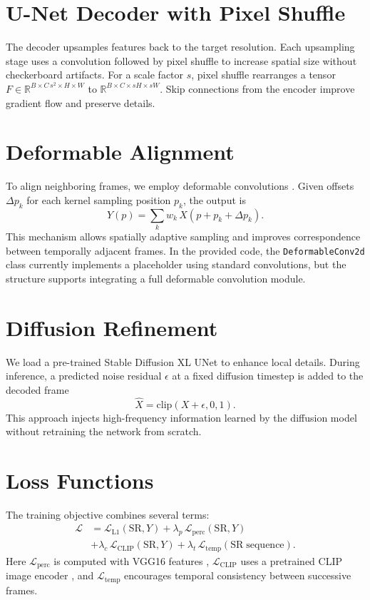 \documentclass{article}
\begin{document}
\section{U-Net Decoder with Pixel Shuffle}
The decoder upsamples features back to the target resolution. Each upsampling stage uses a convolution followed by pixel shuffle to increase spatial size without checkerboard artifacts. For a scale factor $s$, pixel shuffle rearranges a tensor $F \in \mathbb{R}^{B\times C\,s^2\times H\times W}$ to $\mathbb{R}^{B\times C\times sH\times sW}$. Skip connections from the encoder improve gradient flow and preserve details.

\section{Deformable Alignment}
To align neighboring frames, we employ deformable convolutions \cite{Dai2017dc}. Given offsets $\Delta p_k$ for each kernel sampling position $p_k$, the output is
\begin{equation}
Y(p) = \sum_{k} w_k\, X(p + p_k + \Delta p_k).
\end{equation}
This mechanism allows spatially adaptive sampling and improves correspondence between temporally adjacent frames. In the provided code, the \texttt{DeformableConv2d} class currently implements a placeholder using standard convolutions, but the structure supports integrating a full deformable convolution module.

\section{Diffusion Refinement}
We load a pre-trained Stable Diffusion XL UNet \cite{Rombach2022} to enhance local details. During inference, a predicted noise residual $\epsilon$ at a fixed diffusion timestep is added to the decoded frame
\begin{equation}
\hat{X} = \mathrm{clip}(X + \epsilon, 0, 1).
\end{equation}
This approach injects high-frequency information learned by the diffusion model without retraining the network from scratch.

\section{Loss Functions}
The training objective combines several terms:
\begin{align}
\mathcal{L} &= \mathcal{L}_{\mathrm{L1}}(\mathrm{SR}, Y) + \lambda_p \, \mathcal{L}_{\mathrm{perc}}(\mathrm{SR}, Y) \\
&+ \lambda_c \, \mathcal{L}_{\mathrm{CLIP}}(\mathrm{SR}, Y) + \lambda_t \, \mathcal{L}_{\mathrm{temp}}(\mathrm{SR\;sequence}).
\end{align}
Here $\mathcal{L}_{\mathrm{perc}}$ is computed with VGG16 features \cite{Simonyan2014}, $\mathcal{L}_{\mathrm{CLIP}}$ uses a pretrained CLIP image encoder \cite{Radford2021}, and $\mathcal{L}_{\mathrm{temp}}$ encourages temporal consistency between successive frames.
\end{document}

